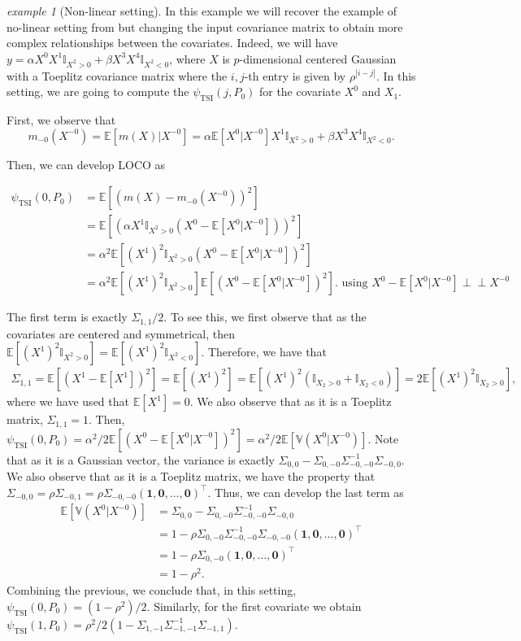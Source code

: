 \documentclass{article}
\theoremstyle{plain}
\theoremstyle{definition}
\theoremstyle{remark}
\newtheorem{examp}[theorem]{example}
\newcommand{\e}[1]{\mathbb{E}\left[#1\right]  } %
\newcommand{\indep}{\perp\!\!\!\perp}
\begin{document}
\begin{examp}[Non-linear setting]\label{ex:LOCO-nonlin}
In this example we will recover the example of no-linear setting from \citet{scornet2022mda} but changing the input covariance matrix to obtain more complex relationships between the covariates. Indeed, we will have $y=\alpha X^0X^1\mathbb{I}_{X^2>0}+\beta X^3X^4\mathbb{I}_{X^2<0}$, where $X$ is $p$-dimensional centered Gaussian with a Toeplitz covariance matrix where the $i,j$-th entry is given by $\rho^{|i-j|}$. In this setting, we are going to compute the $\psi_\mathrm{TSI}(j, P_0)$ for the covariate $X^0$ and $X_1$.

First, we observe that $$m_{-0}(X^{-0})=\e{m(X)|X^{-0}}=\alpha \e{X^0|X^{-0}}X^1\mathbb{I}_{X^2>0}+\beta X^3X^4\mathbb{I}_{X^2<0}.$$

Then, we can develop LOCO as

\begin{align*}
    \psi_\mathrm{TSI}(0, P_0)&=\e{(m(X)-m_{-0}(X^{-0}))^2}\\
    &=\e{\left(\alpha X^1\mathbb{I}_{X^2>0}\left(X^0-\e{X^0|X^{-0}}\right)\right)^2}\\
    &=\alpha^2 \e{(X^1)^2\mathbb{I}_{X^2>0}\left(X^0-\e{X^0|X^{-0}}\right)^2}\\
    &=\alpha^2 \e{(X^1)^2\mathbb{I}_{X^2>0}}\e{\left(X^0-\e{X^0|X^{-0}}\right)^2}.\text{ using $X^0-\e{X^0|X^{-0}}\indep X^{-0}$}
\end{align*}

The first term is exactly $\Sigma_{1,1}/2$. To see this, we first observe that as the covariates are centered and symmetrical, then $\e{(X^1)^2\mathbb{I}_{X^2>0}}=\e{(X^1)^2\mathbb{I}_{X^2<0}}$. Therefore, we have that
\begin{align*}
    \Sigma_{1,1}=\e{(X^1-\e{X^1})^2}=\e{(X^1)^2}=\e{(X^1)^2(\mathbb{I}_{X_2>0}+\mathbb{I}_{X_2<0})}=2\e{(X^1)^2\mathbb{I}_{X_2>0}},
\end{align*}
where we have used that $\e{X^1}=0$. We also observe that as it is a Toeplitz matrix, $\Sigma_{1,1}=1$. Then, $\psi_\mathrm{TSI}(0, P_0)=\alpha^2/2\e{\left(X^0-\e{X^0|X^{-0}}\right)^2}=\alpha^2/2\e{\mathbb{V}(X^0|X^{-0})}.$ Note that as it is a Gaussian vector, the variance is exactly $\Sigma_{0,0}-\Sigma_{0,-0}\Sigma^{-1}_{-0,-0}\Sigma_{-0,0}$. We also observe that as it is a Toeplitz matrix, we have the property that $\Sigma_{-0,0}=\rho\Sigma_{-0, 1}=\rho \Sigma_{-0,-0}(\mathbf{1}, \mathbf{0}, \ldots , \mathbf{0})^\top$. Thus, we can develop the last term as
\begin{align*}
    \e{\mathbb{V}(X^0|X^{-0})}&= \Sigma_{0,0}-\Sigma_{0,-0}\Sigma^{-1}_{-0,-0}\Sigma_{-0,0}\\
    &= 1-\rho\Sigma_{0,-0}\Sigma^{-1}_{-0,-0}\Sigma_{-0,-0}(\mathbf{1}, \mathbf{0}, \ldots , \mathbf{0})^\top\\
    &=1-\rho\Sigma_{0,-0}(\mathbf{1}, \mathbf{0}, \ldots , \mathbf{0})^\top\\
    &=1-\rho^2.
\end{align*}
Combining the previous, we conclude that, in this setting, $\psi_\mathrm{TSI}(0, P_0)=(1-\rho^2)/2.$
Similarly, for the first covariate we obtain $\psi_{\mathrm{TSI}}(1, P_0)=\rho^2/2(1-\Sigma_{1, -1}\Sigma_{-1, -1}^{-1}\Sigma_{-1, 1})$.  
\end{examp}
\end{document}
